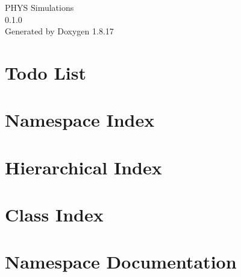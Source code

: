 \let\mypdfximage\pdfximage\def\pdfximage{\immediate\mypdfximage}\documentclass[twoside]{book}
\newcommand{\+}{\discretionary{\mbox{\scriptsize$\hookleftarrow$}}{}{}}
\newcommand{\clearemptydoublepage}{%
  \newpage{\pagestyle{empty}\cleardoublepage}%
}
\begin{document}
\hypersetup{pageanchor=false,
             bookmarksnumbered=true,
             pdfencoding=unicode
            }
\begin{titlepage}
\vspace*{7cm}
\begin{center}%
{\Large P\+H\+YS Simulations \\[1ex]\large 0.\+1.\+0 }\\
\vspace*{1cm}
{\large Generated by Doxygen 1.8.17}\\
\end{center}
\end{titlepage}
\clearemptydoublepage
{}
\tableofcontents
\clearemptydoublepage
{}
\hypersetup{pageanchor=true}

\chapter{Todo List}
\label{todo}

\chapter{Namespace Index}

\chapter{Hierarchical Index}

\chapter{Class Index}

\chapter{Namespace Documentation}










\end{document}
